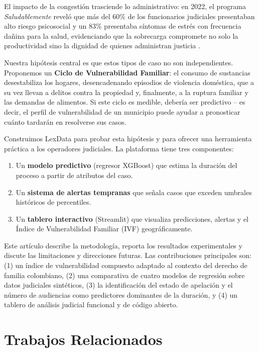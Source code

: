 \documentclass[runningheads]{llncs}
\begin{document}
El impacto de la congesti\'{o}n trasciende lo administrativo: en 2022, el programa \textit{Saludablemente} revel\'{o} que m\'{a}s del 60\% de los funcionarios judiciales presentaban alto riesgo psicosocial y un 83\% presentaba s\'{i}ntomas de estr\'{e}s con frecuencia da\~{n}ina para la salud, evidenciando que la sobrecarga compromete no solo la productividad sino la dignidad de quienes administran justicia \cite{csj2023}.

Nuestra hip\'{o}tesis central es que estos tipos de caso no son independientes. Proponemos un \textbf{Ciclo de Vulnerabilidad Familiar}: el consumo de sustancias desestabiliza los hogares, desencadenando episodios de violencia dom\'{e}stica, que a su vez llevan a delitos contra la propiedad y, finalmente, a la ruptura familiar y las demandas de alimentos. Si este ciclo es medible, deber\'{i}a ser predictivo -- es decir, el perfil de vulnerabilidad de un municipio puede ayudar a pronosticar cu\'{a}nto tardar\'{a}n en resolverse sus casos.

Construimos LexData para probar esta hip\'{o}tesis y para ofrecer una herramienta pr\'{a}ctica a los operadores judiciales. La plataforma tiene tres componentes:
\begin{enumerate}
    \item Un \textbf{modelo predictivo} (regresor XGBoost) que estima la duraci\'{o}n del proceso a partir de atributos del caso.
    \item Un \textbf{sistema de alertas tempranas} que se\~{n}ala casos que exceden umbrales hist\'{o}ricos de percentiles.
    \item Un \textbf{tablero interactivo} (Streamlit) que visualiza predicciones, alertas y el \'Indice de Vulnerabilidad Familiar (IVF) geogr\'{a}ficamente.
\end{enumerate}

Este art\'{i}culo describe la metodolog\'{i}a, reporta los resultados experimentales y discute las limitaciones y direcciones futuras. Las contribuciones principales son: (1) un \'indice de vulnerabilidad compuesto adaptado al contexto del derecho de familia colombiano, (2) una comparativa de cuatro modelos de regresi\'{o}n sobre datos judiciales sint\'{e}ticos, (3) la identificaci\'{o}n del estado de apelaci\'{o}n y el n\'{u}mero de audiencias como predictores dominantes de la duraci\'{o}n, y (4) un tablero de an\'{a}lisis judicial funcional y de c\'{o}digo abierto.

\section{Trabajos Relacionados}
\end{document}
